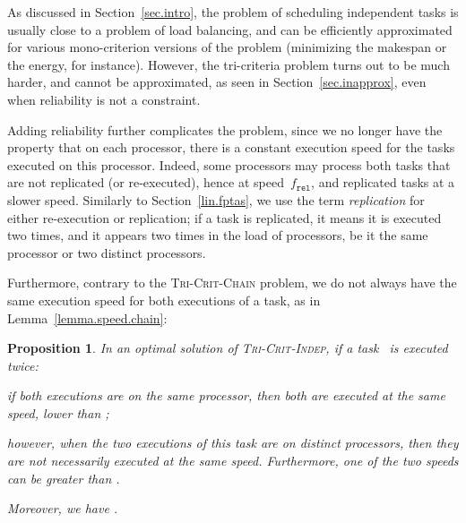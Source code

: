 \documentclass[a4paper]{article}
\theoremstyle{plain}
\newtheorem{proposition}{Proposition}
\theoremstyle{definition}
\theoremstyle{remark}
\newcommand{\fr}{\ensuremath{f_{\texttt{rel}}}\xspace}
\newcommand{\chain}{\textsc{Tri-Crit-Chain}\xspace}
\newcommand{\indep}{\textsc{Tri-Crit-In\-dep}\xspace}
\begin{document}
As discussed in Section~\ref{sec.intro}, the problem of scheduling
independent tasks is usually close to a problem of load balancing, and
can be efficiently approximated for various mono-criterion versions of
the problem (minimizing the makespan or the energy, for instance).  
However, the tri-criteria problem turns out to be much harder, and
cannot be approximated, as seen in Section~\ref{sec.inapprox}, even
when reliability is not a constraint. 

Adding reliability further complicates the problem, since we no longer
have the property that on each processor, there is a constant
execution speed for the tasks executed on this processor. Indeed, some
processors may process both tasks that are not replicated (or
re-executed), hence at speed~\fr, and replicated tasks at a slower
speed.  Similarly to Section~\ref{lin.fptas}, we use the term {\em
  replication} for either re-execution or replication; if a task is
replicated, it means it is executed two times, and it appears two
times in the load of processors, be it the same processor or two
distinct processors.



Furthermore, contrary to the \chain problem, we do not always have the
same execution speed for both executions of a task, as in
Lemma~\ref{lemma.speed.chain}:  
\begin{proposition}
\label{prop.indep}
  In an optimal solution of \indep, if a task~ is executed twice:
\begin{compactitem}
    \item if both executions are on the same processor, then both are executed 
at the same speed, lower than ;
\item however, when the two executions of this task are on distinct
  processors, then they are not necessarily executed at the same
  speed.  Furthermore, one of the two speeds can be greater than
  .
\end{compactitem}
Moreover, we have . 
\end{proposition}
\end{document}
